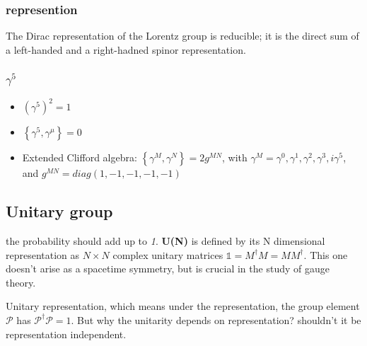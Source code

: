 \subsubsection{represention}
The Dirac representation of the Lorentz group is reducible; it is the direct
sum of a left-handed and a right-hadned spinor representation.

\subsubsection{$\gamma^5$}
\begin{itemize}
    \item $(\gamma^5)^2 = \mathcal{1}$
    \item $\left\{\gamma^5,\gamma^\mu\right\}=0$
    \item Extended Clifford algebra: $\left\{\gamma^M,\gamma^N\right\}=2g^{MN}$, with $\gamma^M =
	\gamma^0,\gamma^1,\gamma^2,\gamma^3,i\gamma^5$, and $g^{MN}=diag(1, -1, -1, -1, -1)$ 
\end{itemize}

\subsection{Unitary group} 
the probability should add up to \emph{1}.
\textbf{U(N)} is defined by its N dimensional representation as $N\times N$
complex unitary matrices $\mathds{1} = M^{\dag}M = MM^{\dag}$. This one
doesn't arise as a spacetime symmetry, but is crucial in the study of gauge
theory. 

Unitary representation, which means under the representation, the group
element $\mathcal{P}$ has $\mathcal{P}^\dag\mathcal{P}=1$. But why the
unitarity depends on representation? shouldn't it be representation
independent.

